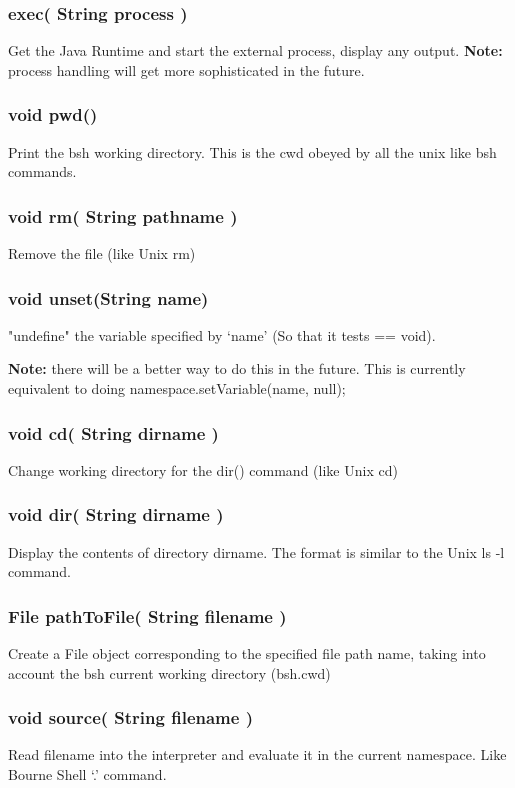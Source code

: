 \documentclass[twoside,11pt]{article}
\renewcommand{\_}{\texttt{\symbol{95}}}
\begin{document}
\subsubsection*{exec( String process )}
Get the Java Runtime and start the external process, display any
output. \textbf{Note:} process handling will get more sophisticated in the
future.

\subsubsection*{void pwd()}
Print the bsh working directory.  This is the cwd obeyed by all the unix
like bsh commands.

\subsubsection*{void rm( String pathname )}
Remove the file (like Unix rm)

\subsubsection*{void unset(String name)}
"undefine" the variable specified by `name' (So that it tests == void).

\textbf{Note:} there will be a better way to do this in the future.  This is
currently equivalent to doing namespace.setVariable(name, null);

\subsubsection*{void cd( String dirname )}
Change working directory for the dir() command (like Unix cd)

\subsubsection*{void dir( String dirname )}
Display the contents of directory dirname. The format is similar to
the Unix ls -l command.

\subsubsection*{File pathToFile( String filename )}
Create a File object corresponding to the specified file path name, taking
into account the bsh current working directory (bsh.cwd)

\subsubsection*{void source( String filename )}
Read filename into the interpreter and evaluate it in the current
namespace.  Like Bourne Shell `.' command.
\end{document}
